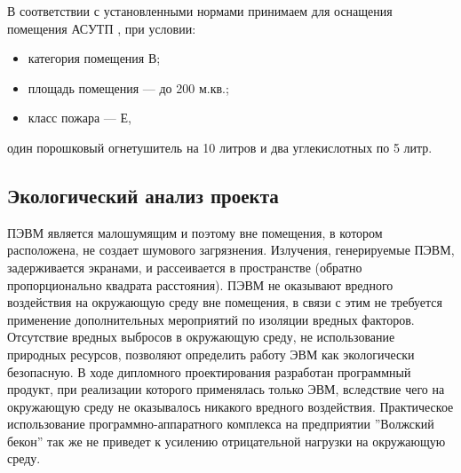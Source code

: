 В соответствии с установленными нормами  принимаем для оснащения помещения АСУТП , при условии:
\begin{itemize}
	\item{} категория помещения  В;
	\item{} площадь помещения --- до 200 м.кв.;
	\item{} класс пожара --- Е,
\end{itemize}
один порошковый огнетушитель на 10 литров и два углекислотных  по 5 литр.


\subsection{Экологический анализ проекта}
ПЭВМ является малошумящим и поэтому вне помещения, в котором расположена, не создает
шумового загрязнения. Излучения, генерируемые ПЭВМ, задерживается экранами, и рассеивается в
пространстве (обратно пропорционально квадрата расстояния). ПЭВМ не оказывают вредного
воздействия на окружающую среду вне помещения, в связи с этим не требуется применение
дополнительных мероприятий по изоляции вредных факторов.
Отсутствие вредных выбросов в окружающую среду, не использование природных ресурсов,
позволяют определить работу ЭВМ как экологически безопасную. В ходе дипломного проектирования
разработан программный продукт, при реализации которого применялась только ЭВМ, вследствие
чего на окружающую среду не оказывалось никакого вредного воздействия. Практическое использование
программно-аппаратного комплекса на предприятии ''Волжский бекон'' так же не приведет к усилению
отрицательной нагрузки на окружающую среду.
